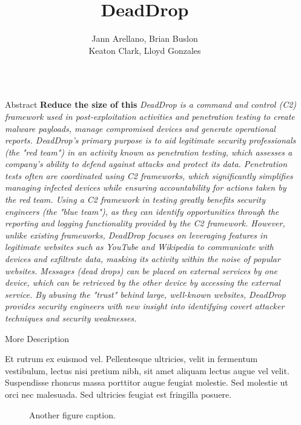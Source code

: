 \documentclass[final]{beamer}
\title{DeadDrop}
\author{Jann Arellano, Brian Buslon\\Keaton Clark, Lloyd Gonzales}
\institute[shortinst]{CSE Department, UNR \and \textbf{Advisor:} Shamik Sengupta. Professor. University of Nevada, Reno \and \textbf{Instructors:} David Feil-Seifer, Devrin Lee, Sara Davis}
\newlength{\sepwidth}
\newlength{\colwidth}
\newcommand{\separatorcolumn}{\begin{column}{\sepwidth}\end{column}}
\begin{document}
\begin{frame}[t]
\begin{columns}[t]
\separatorcolumn

\begin{column}{\colwidth}

  \begin{alertblock}{Abstract}
    \textbf{Reduce the size of this}
    \it{
      DeadDrop is a command and control (C2) framework used in post-exploitation activities and penetration testing to create malware payloads, manage compromised devices and generate operational reports.
      DeadDrop's primary purpose is to aid legitimate security professionals (the "red team") in an activity known as penetration testing, which assesses a company's ability to defend against attacks and protect its data.
      Penetration tests often are coordinated using C2 frameworks, which significantly simplifies managing infected devices while ensuring accountability for actions taken by the red team.
      Using a C2 framework in testing greatly benefits security engineers (the "blue team"), as they can identify opportunities through the reporting and logging functionality provided by the C2 framework.
      However, unlike existing frameworks, DeadDrop focuses on leveraging features in legitimate websites such as YouTube and Wikipedia to communicate with devices and exfiltrate data, masking its activity within the noise of popular websites.
      Messages (dead drops) can be placed on external services by one device, which can be retrieved by the other device by accessing the external service.
      By abusing the "trust" behind large, well-known websites, DeadDrop provides security engineers with new insight into identifying covert attacker techniques and security weaknesses.
    }
  \end{alertblock}

  \begin{block}{More Description}

    Et rutrum ex euismod vel. Pellentesque ultricies, velit in fermentum
    vestibulum, lectus nisi pretium nibh, sit amet aliquam lectus augue vel
    velit. Suspendisse rhoncus massa porttitor augue feugiat molestie. Sed
    molestie ut orci nec malesuada. Sed ultricies feugiat est fringilla
    posuere.

    \begin{figure}
      \centering
      \caption{Another figure caption.}
    \end{figure}


\end{block}
\end{column}
\end{columns}
\end{frame}
\end{document}
